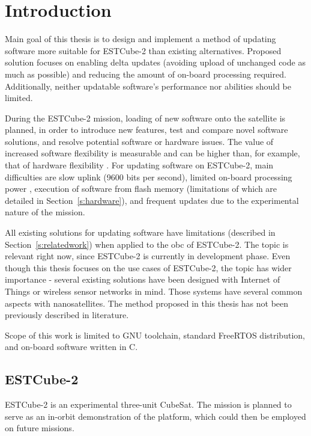 \newpage
\section{Introduction}

Main goal of this thesis is to design and implement a method of updating software more suitable for ESTCube-2 than existing alternatives. Proposed solution focuses on enabling delta updates (avoiding upload of unchanged code as much as possible) and reducing the amount of on-board processing required. Additionally, neither updatable software’s performance nor abilities should be limited.

During the ESTCube-2 mission, loading of new software onto the satellite is planned, in order to introduce new features, test and compare novel software solutions, and resolve potential software or hardware issues. The value of increased software flexibility is measurable and can be higher than, for example, that of hardware flexibility \cite{Nilchiani2009}. For updating software on ESTCube-2, main difficulties are slow uplink (9600 bits per second), limited on-board processing power \cite{Ehrpais2016}, execution of software from flash memory \cite{Haljaste2017} (limitations of which are detailed in Section~\ref{s:hardware}), and frequent updates due to the experimental nature of the mission.

All existing solutions for updating software have limitations (described in Section~\ref{s:relatedwork}) when applied to the \gls{obc} of ESTCube-2. The topic is relevant right now, since ESTCube-2 is currently in development phase. Even though this thesis focuses on the use cases of ESTCube-2, the topic has wider importance - several existing solutions have been designed with Internet of Things or wireless sensor networks \cite{Dunkels2006,Han2005} in mind. Those systems have several common aspects with nanosatellites. The method proposed in this thesis has not been previously described in literature.

Scope of this work is limited to GNU toolchain, standard FreeRTOS distribution, and on-board software written in C.

\subsection{ESTCube-2}

ESTCube-2 is an experimental three-unit CubeSat. The mission is planned to serve as an in-orbit demonstration of the platform, which could then be employed on future missions. \cite{Iakubivskyi2016}

